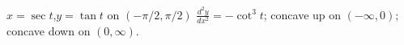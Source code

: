 {$x=\sec t$,\quad  $y=\tan t$ on $(-\pi/2,\pi/2)$}
{$\frac{d^2y}{dx^2}=-\cot^3 t$; concave up on $(-\infty,0)$; concave down on $(0,\infty)$.}
